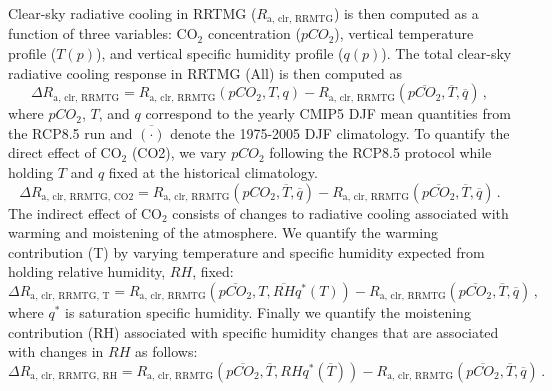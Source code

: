 \documentclass[draft]{agujournal2019}
\begin{document}
Clear-sky radiative cooling in RRTMG ($R_\mathrm{a,\,clr,\,RRMTG}$) is then computed as a function of three variables: CO$_2$ concentration ($pCO_2$), vertical temperature profile ($T(p)$), and vertical specific humidity profile ($q(p)$). The total clear-sky radiative cooling response in RRTMG (All) is then computed as
\begin{equation}
    \Delta R_\mathrm{a,\,clr,\,RRMTG} = R_\mathrm{a,\,clr,\,RRMTG}(pCO_2, T, q) - R_\mathrm{a,\,clr,\,RRMTG}(\overline{pCO_2}, \overline{T}, \overline{q})\, ,
\end{equation}
where $pCO_2$, $T$, and $q$ correspond to the yearly CMIP5 DJF mean quantities from the RCP8.5 run and $\overline{(\cdot)}$ denote the 1975-2005 DJF climatology. To quantify the direct effect of CO$_2$ (CO2), we vary $pCO_2$ following the RCP8.5 protocol while holding $T$ and $q$ fixed at the historical climatology.
\begin{equation}
    \Delta R_\mathrm{a,\,clr,\,RRMTG,\,CO2} = R_\mathrm{a,\,clr,\,RRMTG}(pCO_2, \overline{T}, \overline{q}) - R_\mathrm{a,\,clr,\,RRMTG}(\overline{pCO_2}, \overline{T}, \overline{q})\, .
\end{equation}
The indirect effect of CO$_2$ consists of changes to radiative cooling associated with warming and moistening of the atmosphere. We quantify the warming contribution (T) by varying temperature and specific humidity expected from holding relative humidity, $RH$, fixed:
\begin{equation}
    \Delta R_\mathrm{a,\,clr,\,RRMTG,\,T} = R_\mathrm{a,\,clr,\,RRMTG}(\overline{pCO_2}, T, \overline{RH}q^{\ast}(T)) - R_\mathrm{a,\,clr,\,RRMTG}(\overline{pCO_2}, \overline{T}, \overline{q})\, ,
\end{equation}
where $q^\ast$ is saturation specific humidity. Finally we quantify the moistening contribution (RH) associated with specific humidity changes that are associated with changes in $RH$ as follows:
\begin{equation}
    \Delta R_\mathrm{a,\,clr,\,RRMTG,\,RH} = R_\mathrm{a,\,clr,\,RRMTG}(\overline{pCO_2}, \overline{T}, RHq^{\ast}(\overline{T})) - R_\mathrm{a,\,clr,\,RRMTG}(\overline{pCO_2}, \overline{T}, \overline{q})\, .
\end{equation}
\end{document}
